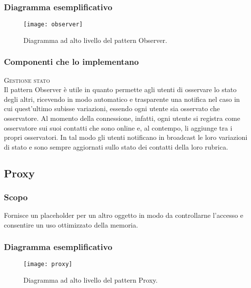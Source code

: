 \subsubsection{Diagramma esemplificativo}
\begin{figure}[h]
\centering
\texttt{[image: observer]}
\caption{Diagramma ad alto livello del pattern Observer.}\label{fig:observer}
\end{figure}

\subsubsection{Componenti che lo implementano}
\begin{description}
  \item{\scshape\ttfamily Gestione stato}\\
Il pattern Observer è utile in quanto permette agli utenti di osservare lo stato degli altri, ricevendo in modo automatico e trasparente una notifica nel caso in cui quest'ultimo subisse variazioni, essendo ogni utente sia osservato che osservatore. Al momento della connessione, infatti, ogni utente si registra come osservatore sui suoi contatti che sono online e, al contempo, li aggiunge tra i propri osservatori. In tal modo gli utenti notificano in broadcast le loro variazioni di stato e sono sempre aggiornati sullo stato dei contatti della loro rubrica.
\end{description}

\subsection{Proxy}
\subsubsection{Scopo}
Fornisce un placeholder per un altro oggetto in modo da controllarne l'accesso e consentire un uso ottimizzato della memoria.

\subsubsection{Diagramma esemplificativo}
\begin{figure}
\texttt{[image: proxy]}
\caption{Diagramma ad alto livello del pattern Proxy.}\label{fig:proxy}
\end{figure}

